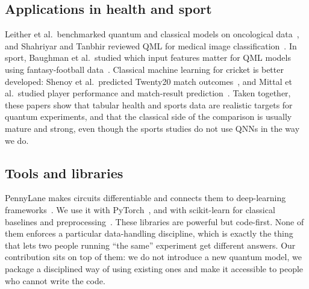 \documentclass[12pt,onecolumn,draftclsnofoot]{IEEEtran}
\begin{document}
\subsection{Applications in health and sport}
Leither et al.\ benchmarked quantum and classical models on oncological data~\cite{leither2026oncology}, and Shahriyar and Tanbhir reviewed QML for medical image classification~\cite{shahriyar2025medical}. In sport, Baughman et al.\ studied which input features matter for QML models using fantasy-football data~\cite{baughman2022feature}. Classical machine learning for cricket is better developed: Shenoy et al.\ predicted Twenty20 match outcomes~\cite{shenoy2022t20}, and Mittal et al.\ studied player performance and match-result prediction~\cite{mittal2021player}. Taken together, these papers show that tabular health and sports data are realistic targets for quantum experiments, and that the classical side of the comparison is usually mature and strong, even though the sports studies do not use QNNs in the way we do.

\subsection{Tools and libraries}
PennyLane makes circuits differentiable and connects them to deep-learning frameworks~\cite{bergholm2018pennylane}. We use it with PyTorch~\cite{paszke2019pytorch}, and with scikit-learn for classical baselines and preprocessing~\cite{pedregosa2011sklearn}. These libraries are powerful but code-first. None of them enforces a particular data-handling discipline, which is exactly the thing that lets two people running ``the same'' experiment get different answers. Our contribution sits on top of them: we do not introduce a new quantum model, we package a disciplined way of using existing ones and make it accessible to people who cannot write the code.
\end{document}
